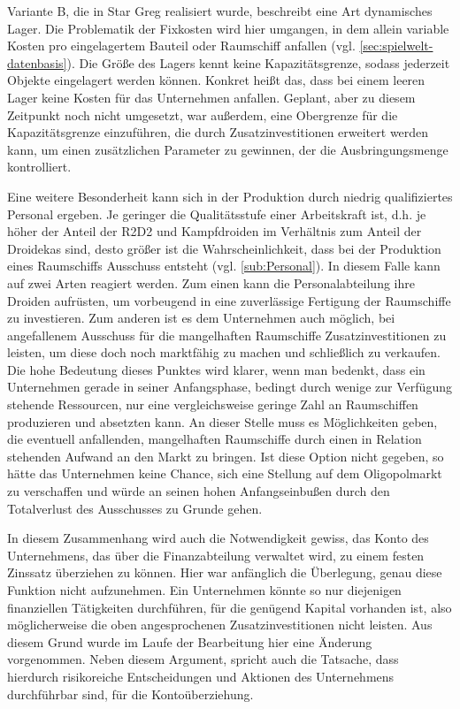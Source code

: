 Variante B, die in Star Greg realisiert wurde, beschreibt eine Art dynamisches Lager. Die Problematik der Fixkosten wird hier umgangen, in dem allein variable Kosten pro eingelagertem Bauteil oder Raumschiff anfallen (vgl. \ref{sec:spielwelt-datenbasis}). Die Größe des Lagers kennt keine Kapazitätsgrenze, sodass jederzeit Objekte eingelagert werden können. Konkret heißt das, dass bei einem leeren Lager keine Kosten für das Unternehmen anfallen. Geplant, aber zu diesem Zeitpunkt noch nicht umgesetzt, war außerdem, eine Obergrenze für die Kapazitätsgrenze einzuführen, die durch Zusatzinvestitionen erweitert werden kann, um einen zusätzlichen Parameter zu gewinnen, der die Ausbringungsmenge kontrolliert. 

Eine weitere Besonderheit kann sich in der Produktion durch niedrig qualifiziertes Personal ergeben. Je geringer die Qualitätsstufe einer Arbeitskraft ist, d.h. je höher der Anteil der R2D2 und Kampfdroiden im Verhältnis zum Anteil der Droidekas sind, desto größer ist die Wahrscheinlichkeit, dass bei der Produktion eines Raumschiffs Ausschuss entsteht (vgl. \ref{sub:Personal}). In diesem Falle kann auf zwei Arten reagiert werden. Zum einen kann die Personalabteilung ihre Droiden aufrüsten, um vorbeugend in eine zuverlässige Fertigung der Raumschiffe zu investieren. Zum anderen ist es dem Unternehmen auch möglich, bei angefallenem Ausschuss für die mangelhaften Raumschiffe Zusatzinvestitionen zu leisten, um diese doch noch marktfähig zu machen und schließlich zu verkaufen. Die hohe Bedeutung dieses Punktes wird klarer, wenn man bedenkt, dass ein Unternehmen gerade in seiner Anfangsphase, bedingt durch wenige zur Verfügung stehende Ressourcen, nur eine vergleichsweise geringe Zahl an Raumschiffen produzieren und absetzten kann. An dieser Stelle muss es Möglichkeiten geben, die eventuell anfallenden, mangelhaften Raumschiffe durch einen in Relation stehenden Aufwand an den Markt zu bringen. Ist diese Option nicht gegeben, so hätte das Unternehmen keine Chance, sich eine Stellung auf dem Oligopolmarkt zu verschaffen und würde an seinen hohen Anfangseinbußen durch den Totalverlust des Ausschusses zu Grunde gehen. 

In diesem Zusammenhang wird auch die Notwendigkeit gewiss, das Konto des Unternehmens, das über die Finanzabteilung verwaltet wird, zu einem festen Zinssatz überziehen zu können. Hier war anfänglich die Überlegung, genau diese Funktion nicht aufzunehmen. Ein Unternehmen könnte so nur diejenigen finanziellen Tätigkeiten durchführen, für die genügend Kapital vorhanden ist, also möglicherweise die oben angesprochenen Zusatzinvestitionen nicht leisten. Aus diesem Grund wurde im Laufe der Bearbeitung hier eine Änderung vorgenommen.  Neben diesem Argument, spricht auch die Tatsache, dass hierdurch risikoreiche Entscheidungen und Aktionen des Unternehmens durchführbar sind, für die Kontoüberziehung.

\autorende{}

